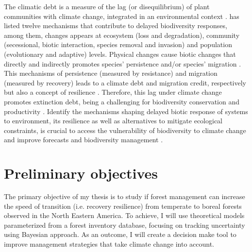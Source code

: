 The climatic debt is a measure of the lag (or disequilibrium) of plant communities with climate change, integrated in an environmental context \citep{Bertrand2016}.
\citet{Essl2015} has listed twelve mechanisms that contribute to delayed biodiversity responses, among them, changes appears at ecosystem (loss and degradation), community (secessional, biotic interaction, species removal and invasion) and population (evolutionary and adaptive) levels.
Physical changes cause biotic changes that directly and indirectly promotes species' persistence and/or species' migration \citep{Bertrand2016}.
This mechanisms of persistence (measured by resistance) and migration (measured by recovery) leads to a climate debt and migration credit, respectively \citep{Bertrand2016} but also a concept of resilience\footnotemark{} \citep{Oliver2015}.
Therefore, this lag under climate change promotes extinction debt, being a challenging for biodiversity conservation \citep{Kuussaari2009} and productivity \citep{Lasch2002}.
Identify the mechanisms shaping delayed biotic response of systems to environment, its resilience as well as alternatives to mitigate ecological constraints, is crucial to access the vulnerability of biodiversity to climate change and improve forecasts and biodiversity management \citep{Essl2015,Oliver2015,Bertrand2016}.


\section{Preliminary objectives}

The primary objective of my thesis is to study if forest management can increase the speed of transition (i.e. recovery resilience) from temperate to boreal forests observed in the North Eastern America.
To achieve, I will use theoretical models parameterized from a forest inventory database, focusing on tracking uncertainty using Bayesian approach.
As an outcome, I will create a decision make tool to improve management strategies that take climate change into account.


